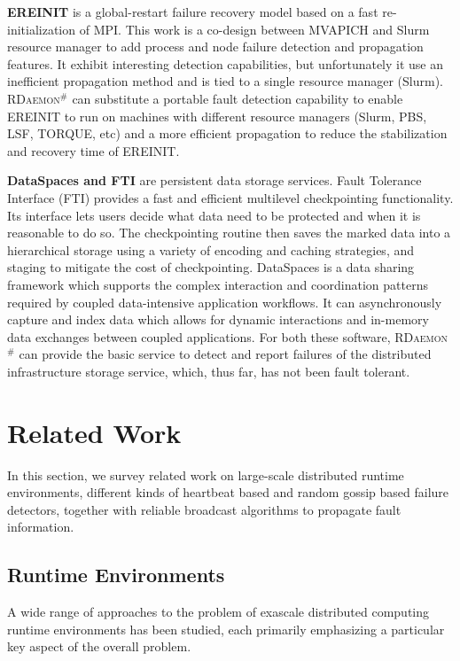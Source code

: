 \documentclass[sigconf]{acmart}
\newcommand{\mpi}[0]{\textsc{MPI}\xspace}
\newcommand{\ourwork}[0]{\textsc{RDaemon}\ensuremath{^\#}\xspace}
\begin{document}
\textbf{EREINIT} is a global-restart failure recovery model based 
on a fast re-initialization of \mpi. This work is a co-design between MVAPICH and Slurm resource manager to add process and node failure detection and propagation features.
It exhibit interesting detection capabilities, but unfortunately it use an inefficient propagation method and is tied to a single resource manager (Slurm). \ourwork can substitute a portable fault detection capability to enable 
EREINIT to run on machines with different resource managers (Slurm, PBS, LSF, TORQUE, etc) and a more efficient propagation
to reduce the stabilization and recovery time of EREINIT.

\textbf{DataSpaces and FTI} are persistent data storage services. 
Fault Tolerance Interface (FTI) provides a fast and efficient multilevel
checkpointing functionality. Its interface lets users decide what data need to be protected and when it is reasonable to do so. The 
checkpointing routine then saves the marked data into a hierarchical storage using a variety of 
encoding and caching strategies, and staging to mitigate the cost of checkpointing.
DataSpaces is a data sharing framework which supports the complex
interaction and coordination patterns required by coupled data-intensive application workflows. 
It can asynchronously capture and index data  which allows for dynamic interactions and in-memory
data exchanges between coupled applications. For both these software, \ourwork can provide the basic service to 
detect and report  failures of the distributed infrastructure storage service, which, thus far, has not been 
fault tolerant.
 
\section{Related Work}\label{sec:related}
In this section, we survey related work on large-scale distributed runtime environments, different kinds of heartbeat based and random gossip based failure detectors, together with reliable broadcast algorithms to propagate fault information.

\subsection{Runtime Environments}
A wide range of approaches to the problem of exascale distributed computing runtime environments has been studied, each primarily emphasizing a particular key aspect of the overall problem.
\end{document}
